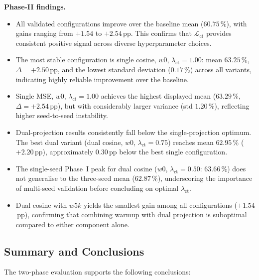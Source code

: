 \noindent
\textbf{Phase-II findings.}
\begin{itemize}
\item All validated configurations improve over the baseline mean
  ($60.75$\,\%), with gains ranging from $+1.54$ to $+2.54$\,pp. This
  confirms that $\mathcal{L}_\text{ct}$ provides consistent positive
  signal across diverse hyperparameter choices.

\item The most stable configuration is single cosine, $w0$,
  $\lambda_\text{ct}=1.00$: mean $63.25$\,\%, $\Delta=+2.50$\,pp, and the
  lowest standard deviation ($0.17$\,\%) across all variants, indicating
  highly reliable improvement over the baseline.

\item Single MSE, $w0$, $\lambda_\text{ct}=1.00$ achieves the highest
  displayed mean ($63.29$\,\%, $\Delta=+2.54$\,pp), but with considerably
  larger variance (std $1.20$\,\%), reflecting higher seed-to-seed
  instability.

\item Dual-projection results consistently fall below the single-projection
  optimum. The best dual variant (dual cosine, $w0$,
  $\lambda_\text{ct}=0.75$) reaches mean $62.95$\,\% ($+2.20$\,pp), approximately
  $0.30$\,pp below the best single configuration.

\item The single-seed Phase~I peak for dual cosine
  ($w0$, $\lambda_\text{ct}=0.50$: $63.66$\,\%) does not generalise to the
  three-seed mean ($62.87$\,\%), underscoring the importance of multi-seed
  validation before concluding on optimal $\lambda_\text{ct}$.

\item Dual cosine with $w5k$ yields the smallest gain among all
  configurations ($+1.54$\,pp), confirming that combining warmup with
  dual projection is suboptimal compared to either component alone.
\end{itemize}

\subsection{Summary and Conclusions}
\label{subsec:ct-summary}

The two-phase evaluation supports the following conclusions:

